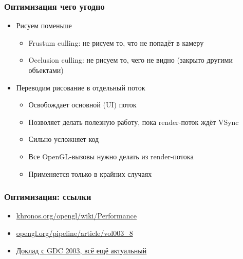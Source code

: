 \documentclass{beamer}
\begin{document}
\begin{frame}[fragile]
\frametitle{Оптимизация чего угодно}
\begin{itemize}
\item Рисуем поменьше
\begin{itemize}
\item Frustum culling: не рисуем то, что не попадёт в камеру
\pause
\item Occlusion culling: не рисуем то, чего не видно (закрыто другими объектами)
\end{itemize}
\pause
\item Переводим рисование в отдельный поток
\begin{itemize}
\item Освобождает основной (UI) поток
\pause
\item Позволяет делать полезную работу, пока render-поток ждёт VSync
\pause
\item Сильно усложняет код
\pause
\item Все OpenGL-вызовы нужно делать из render-потока
\pause
\item Применяется только в крайних случаях
\end{itemize}
\end{itemize}
\end{frame}

\begin{frame}[fragile]
\frametitle{Оптимизация: ссылки}
\begin{itemize}
\item \href{https://www.khronos.org/opengl/wiki/Performance}{khronos.org/opengl/wiki/Performance}
\item \href{https://www.opengl.org/pipeline/article/vol003_8}{opengl.org/pipeline/article/vol003\_8}
\item \href{https://www.nvidia.com/docs/IO/8230/GDC2003_OGL_Performance.pdf}{Доклад с GDC 2003, всё ещё актуальный}
\end{itemize}
\end{frame}
\end{document}
